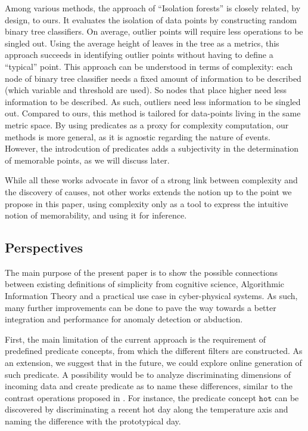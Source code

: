 \documentclass[entropy,article,submit,moreauthors,pdftex]{Definitions/mdpi}
\begin{document}
Among various methods, the approach of ``Isolation forests''\cite{liu_isolation_2008,hariri_extended_2021} is closely related, by design, to ours. It evaluates the isolation of data points by constructing random binary tree classifiers. On average, outlier points will require less operations to be singled out. Using the average height of leaves in the tree as a metrics, this approach succeeds in identifying outlier points without having to define a ``typical'' point. This approach can be understood in terms of complexity: each node of binary tree classifier needs a fixed amount of information to be described (which variable and threshold are used). So nodes that place higher need less information to be described. As such, outliers need less information to be singled out. Compared to ours, this method is tailored for data-points living in the same metric space. By using predicates as a proxy for complexity computation, our methods is more general, as it is agnostic regarding the nature of events. However, the introdcution of predicates adds a subjectivity in the determination of memorable points, as we will discuss later.

While all these works advocate in favor of a strong link between complexity and the
discovery of causes, not other works extends the notion up to the point we propose in this paper, using complexity only as a tool to express the intuitive notion of memorability, and using it for inference.

\subsection{Perspectives}
\label{sec:future}
The main purpose of the present paper is to show the possible connections
between existing definitions of simplicity from cognitive science, Algorithmic
Information Theory and a practical use case in cyber-physical systems. As such,
many further improvements can be done to pave the way towards a better
integration and performance for anomaly detection or abduction.

First, the main limitation of the current approach is the requirement of
predefined predicate concepts, from which the different filters are constructed.
As an extension, we suggest that in the future, we could explore online
generation of such predicate. A possibility would be to analyze discriminating
dimensions of incoming data and create predicate as to name these differences,
similar to the contrast operations proposed in \cite{dessalles_conceptual_2015,
    gardenfors2004conceptual}. For instance, the predicate concept $\mathtt{hot}$
can be discovered by discriminating a recent hot day along the
temperature axis and naming the difference with the prototypical day.
\end{document}
